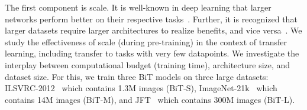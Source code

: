 \documentclass[runningheads]{llncs}
\newcommand{\name}{{BiT}}
\newcommand{\hyper}{{BiT-HyperRule}}
\newcommand{\imagenet}{{ILSVRC-2012}}
\begin{document}
\begin{comment}
\begin{wraptable}{l}{6.5cm}
\caption{The proposed hyperparameter (HP) selection strategy for downstream tasks, \hyper{}, that we use for all transfer runs in this paper.}
\begin{tabular}{|c|l|}
\hline
\textbf{HP} & \textbf{Values} \\
\hline\hline
\textbf{Optimizer} & SGD \\
    &\textbf{learning rate:} 0.003 \\
    &\textbf{momentum:} 0.9 \\
    &\textbf{batch size:} 512 \\
\hline
\textbf{Resolution} & If min image side length \\
    & \textless{}\SI{96}{\px\relax}: resize(160),crop(128) \\
    & \textgreater{}\SI{96}{\px\relax}: resize(448),crop(384) \\
\hline
\textbf{MixUp} & If training samples \\
    &\textless{}\SI{20}{\kilo\relax}: NO \\
    &\textgreater{}\SI{20}{\kilo\relax}: YES \\ 
\hline
\textbf{Training} & If training samples \\
    \textbf{steps}&\textless{}\SI{20}{\kilo\relax}: 500 \\
    &\SI{20}{\kilo\relax}-\SI{500}{\kilo\relax}: \SI{10}{\kilo\relax} \\
    &\textgreater{}\SI{500}{\kilo\relax}: \SI{20}{\kilo\relax} \\
\hline                                            
\end{tabular}
\label{tab:hpheuristics}
\end{wraptable}
\end{comment}

The first component is scale.
It is well-known in deep learning that larger networks perform better on their respective tasks~\cite{he2016deep,simonyan2014very}.
Further, it is recognized that larger datasets require larger architectures to realize benefits, and vice versa~\cite{kaplan2020scaling,rosenfeld2019constructive}.
We study the effectiveness of scale (during pre-training) in the context of transfer learning, including transfer to tasks with very few datapoints.
We investigate the interplay between computational budget (training time), architecture size, and dataset size.
For this, we train three \name{} models on three large datasets: 
\imagenet{}~\cite{imagenet} which contains 1.3M images (\name{}-S), ImageNet-21k~\cite{deng2009imagenet} which contains 14M images (\name{}-M),
and JFT~\cite{sun2017revisiting} which contains 300M images (\name{}-L).
\end{document}
